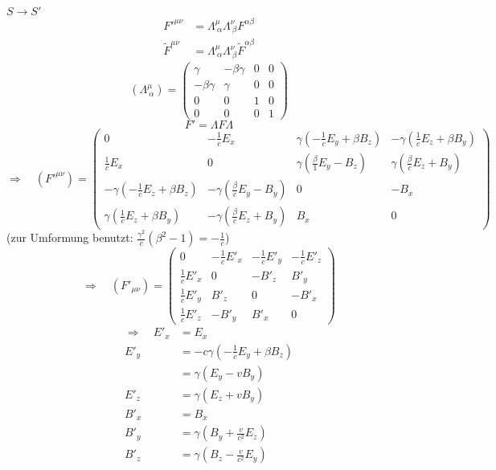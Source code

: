 $ S \to S' $
\begin{align*}
{F'}^{\mu \nu} &= \Lambda^{\mu}_{\ \alpha} \Lambda^{\nu}_{\ \beta} F^{\alpha \beta}\\
\tilde{F}^{\mu \nu} &= \Lambda^{\mu}_{\ \alpha} \Lambda^{\nu}_{\ \beta} \tilde{F}^{\alpha \beta}
\end{align*}
%
%
%
%
%
%
\begin{equation*}
(\Lambda^{\mu}_{\ \alpha}) = \begin{pmatrix}
\gamma & - \beta \gamma & 0 & 0 \\
- \beta \gamma & \gamma & 0 & 0 \\
0 & 0 & 1 & 0 \\
0 & 0 & 0 & 1
\end{pmatrix}
\end{equation*}
\begin{equation*}
F' = \Lambda F \Lambda
\end{equation*}
\begin{equation*}
\Rightarrow \quad (F'^{\mu \nu}) = \begin{pmatrix}
0 & - \frac{1}{c} E_x & \gamma (- \frac{1}{c} E_y + \beta B_z) & - \gamma (\frac{1}{c} E_z + \beta B_y) \\[10pt]
\frac{1}{c} E_x & 0 & \gamma (\frac{\beta}{1} E_y - B_z) & \gamma (\frac{\beta}{c} E_z + B_y) \\[10pt]
 - \gamma ( - \frac{1}{c} E_z + \beta B_z) & - \gamma (\frac{\beta}{c} E_y - B_y) & 0 & - B_x \\[10pt]
\gamma (\frac{1}{c} E_z + \beta B_y)  & - \gamma (\frac{\beta}{c} E_z + B_y) & B_x & 0
\end{pmatrix}
\end{equation*}
(zur Umformung benutzt: $ \frac{\gamma^2}{c} (\beta^2 - 1) = - \frac{1}{c} $)
\begin{equation*}
\Rightarrow \quad (F'_{\mu \nu}) = \begin{pmatrix}
0 & - \frac{1}{c} E'_x & - \frac{1}{c} E'_y & - \frac{1}{c} E'_z \\[10pt]
\frac{1}{c} E'_x & 0 & - B'_z & B'_y \\[10pt]
\frac{1}{c} E'_y & B'_z & 0 & - B'_x \\[10pt]
\frac{1}{c} E'_z & - B'_y & B'_x & 0
\end{pmatrix}
\end{equation*}
\begin{align*}
\Rightarrow \quad E'_x &= E_x \\[5pt]
E'_y &= - c \gamma (- \frac{1}{c} E_y + \beta B_z) \\
&= \gamma (E_y - v B_y) \\[5pt]
E'_z &= \gamma (E_z + v B_y) \\[10pt]
B'_x &= B_x \\
B'_y &= \gamma (B_y + \frac{v}{c^2} E_z) \\
B'_z &= \gamma (B_z - \frac{v}{c^2} E_y)
\end{align*}
